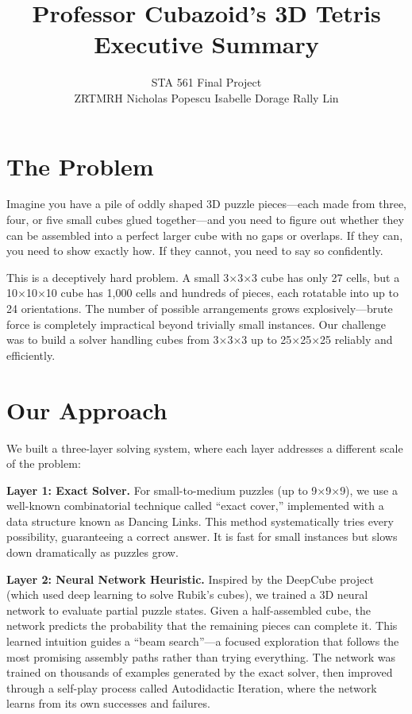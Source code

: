 \documentclass[11pt]{article}
\title{\textbf{Professor Cubazoid's 3D Tetris}\\[0.3em]
\large Executive Summary}
\author{STA 561 Final Project\\[0.3em]
ZRTMRH \quad Nicholas Popescu \quad Isabelle Dorage \quad Rally Lin}
\date{}
\begin{document}
\maketitle
\thispagestyle{empty}

\section*{The Problem}

Imagine you have a pile of oddly shaped 3D puzzle pieces---each made from three, four, or five small cubes glued together---and you need to figure out whether they can be assembled into a perfect larger cube with no gaps or overlaps. If they can, you need to show exactly how. If they cannot, you need to say so confidently.

This is a deceptively hard problem. A small 3$\times$3$\times$3 cube has only 27 cells, but a 10$\times$10$\times$10 cube has 1,000 cells and hundreds of pieces, each rotatable into up to 24 orientations. The number of possible arrangements grows explosively---brute force is completely impractical beyond trivially small instances. Our challenge was to build a solver handling cubes from 3$\times$3$\times$3 up to 25$\times$25$\times$25 reliably and efficiently.

\section*{Our Approach}

We built a three-layer solving system, where each layer addresses a different scale of the problem:

\textbf{Layer 1: Exact Solver.}
For small-to-medium puzzles (up to 9$\times$9$\times$9), we use a well-known combinatorial technique called ``exact cover,'' implemented with a data structure known as Dancing Links. This method systematically tries every possibility, guaranteeing a correct answer. It is fast for small instances but slows down dramatically as puzzles grow.

\textbf{Layer 2: Neural Network Heuristic.}
Inspired by the DeepCube project (which used deep learning to solve Rubik's cubes), we trained a 3D neural network to evaluate partial puzzle states. Given a half-assembled cube, the network predicts the probability that the remaining pieces can complete it. This learned intuition guides a ``beam search''---a focused exploration that follows the most promising assembly paths rather than trying everything. The network was trained on thousands of examples generated by the exact solver, then improved through a self-play process called Autodidactic Iteration, where the network learns from its own successes and failures.
\end{document}
